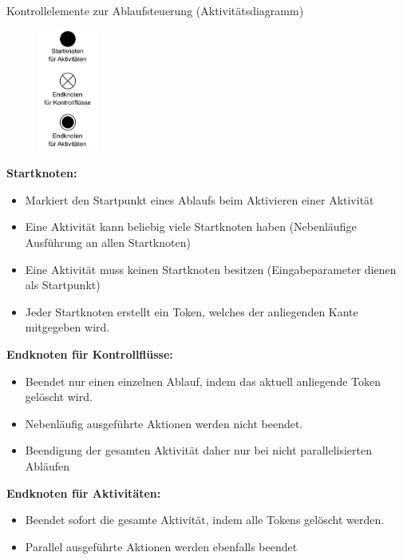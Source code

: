 \begin{defi}{Kontrollelemente zur Ablaufsteuerung (Aktivitätsdiagramm)}
    \begin{figure}
        \centering
        \includegraphics[width=0.175\textwidth]{includes/figures/defi_diagrams_activity_start_end.pdf}
    \end{figure}
    \textbf{Startknoten:}
    \begin{itemize}
        \item Markiert den Startpunkt eines Ablaufs beim Aktivieren einer Aktivität
        \item Eine Aktivität kann beliebig viele Startknoten haben (Nebenläufige Ausführung an allen Startknoten)
        \item Eine Aktivität muss keinen Startknoten besitzen (Eingabeparameter dienen als Startpunkt)
        \item Jeder Startknoten erstellt ein Token, welches der anliegenden Kante mitgegeben wird.
    \end{itemize}

    \textbf{Endknoten für Kontrollflüsse:}
    \begin{itemize}
        \item Beendet nur einen einzelnen Ablauf, indem das aktuell anliegende Token gelöscht wird.
        \item Nebenläufig ausgeführte Aktionen werden nicht beendet.
        \item Beendigung der gesamten Aktivität daher nur bei nicht parallelisierten Abläufen
    \end{itemize}

    \textbf{Endknoten für Aktivitäten:}
    \begin{itemize}
        \item Beendet sofort die gesamte Aktivität, indem alle Tokens gelöscht werden.
        \item Parallel ausgeführte Aktionen werden ebenfalls beendet
    \end{itemize}
\end{defi}

